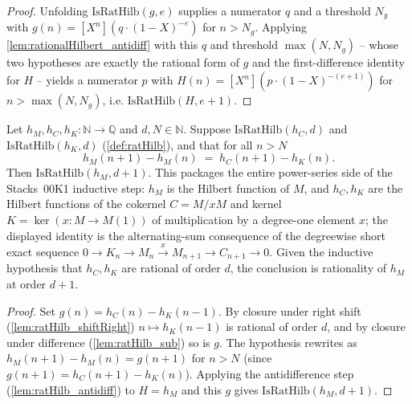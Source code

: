 \begin{proof}
  \leanok
  Unfolding \(\mathrm{IsRatHilb}(g, e)\) supplies a numerator \(q\) and a
  threshold \(N_g\) with \(g(n) = [X^n](q\cdot(1-X)^{-e})\) for \(n > N_g\).
  Applying \cref{lem:rationalHilbert_antidiff} with this \(q\) and threshold
  \(\max(N, N_g)\) -- whose two hypotheses are exactly the rational form of \(g\)
  and the first-difference identity for \(H\) -- yields a numerator \(p\) with
  \(H(n) = [X^n](p\cdot(1-X)^{-(e+1)})\) for \(n > \max(N, N_g)\), i.e.
  \(\mathrm{IsRatHilb}(H, e+1)\).
\end{proof}

\begin{lemma}
  \label{lem:ratHilb_ofDiffEq}
  Let \(h_M, h_C, h_K : \mathbb{N} \to \mathbb{Q}\) and \(d, N \in \mathbb{N}\).
  Suppose \(\mathrm{IsRatHilb}(h_C, d)\) and \(\mathrm{IsRatHilb}(h_K, d)\)
  (\cref{def:ratHilb}), and that for all \(n > N\)
  \[
    h_M(n+1) - h_M(n) \;=\; h_C(n+1) - h_K(n).
  \]
  Then \(\mathrm{IsRatHilb}(h_M, d+1)\). This packages the entire power-series
  side of the Stacks~00K1 inductive step: \(h_M\) is the Hilbert function of
  \(M\), and \(h_C, h_K\) are the Hilbert functions of the cokernel
  \(C = M/xM\) and kernel \(K = \ker(x : M \to M(1))\) of multiplication by a
  degree-one element \(x\); the displayed identity is the alternating-sum
  consequence of the degreewise short exact sequence
  \(0 \to K_n \to M_n \xrightarrow{x} M_{n+1} \to C_{n+1} \to 0\). Given the
  inductive hypothesis that \(h_C, h_K\) are rational of order \(d\), the
  conclusion is rationality of \(h_M\) at order \(d+1\).
\end{lemma}

\begin{proof}
  \leanok
  Set \(g(n) = h_C(n) - h_K(n-1)\). By closure under right shift
  (\cref{lem:ratHilb_shiftRight}) \(n \mapsto h_K(n-1)\) is rational of order
  \(d\), and by closure under difference (\cref{lem:ratHilb_sub}) so is \(g\). The
  hypothesis rewrites as \(h_M(n+1) - h_M(n) = g(n+1)\) for \(n > N\) (since
  \(g(n+1) = h_C(n+1) - h_K(n)\)). Applying the antidifference step
  (\cref{lem:ratHilb_antidiff}) to \(H = h_M\) and this \(g\) gives
  \(\mathrm{IsRatHilb}(h_M, d+1)\).
\end{proof}

